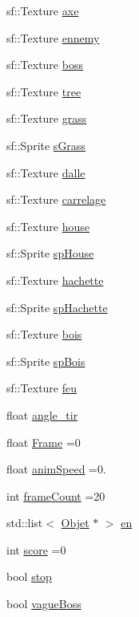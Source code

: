 \begin{DoxyCompactItemize}
\item 
sf\+::\+Texture \hyperlink{classsfml_jeu_a1110dee5dbd800eb85c6f8588c57f906}{axe}
\item 
sf\+::\+Texture \hyperlink{classsfml_jeu_a7bb478fb8a036dba31d51b0678f71930}{ennemy}
\item 
sf\+::\+Texture \hyperlink{classsfml_jeu_a38bffc74c712e3237ddd2e4361b0868c}{boss}
\item 
sf\+::\+Texture \hyperlink{classsfml_jeu_ac53f32205231b1555a312b5298ee024f}{tree}
\item 
sf\+::\+Texture \hyperlink{classsfml_jeu_aea5ada868bfe1291ee70b4827ec54240}{grass}
\item 
sf\+::\+Sprite \hyperlink{classsfml_jeu_a74a092fa8b6b1a34ca7858dce6b22f42}{s\+Grass}
\item 
sf\+::\+Texture \hyperlink{classsfml_jeu_a595b5cbf01e0dd2f30985df54ac9db1b}{dalle}
\item 
sf\+::\+Texture \hyperlink{classsfml_jeu_a0e6b0177e0dadf4351c7e432652d2fd6}{carrelage}
\item 
sf\+::\+Texture \hyperlink{classsfml_jeu_a802c6b71f6fc4338ed0c002c95d2f3cb}{house}
\item 
sf\+::\+Sprite \hyperlink{classsfml_jeu_ad4d63e936baa8c93f82296f3eac35c98}{sp\+House}
\item 
sf\+::\+Texture \hyperlink{classsfml_jeu_ab3fd5eb49efc3763c68019588eeba638}{hachette}
\item 
sf\+::\+Sprite \hyperlink{classsfml_jeu_a931aef757693c4633ab16eb1a4cbebf8}{sp\+Hachette}
\item 
sf\+::\+Texture \hyperlink{classsfml_jeu_aec313ef2ce46db16fd996024dcae9976}{bois}
\item 
sf\+::\+Sprite \hyperlink{classsfml_jeu_a9af83fa09c80255e70bd3a8a7ba10372}{sp\+Bois}
\item 
sf\+::\+Texture \hyperlink{classsfml_jeu_aedabf9043126c13b0273aeccfb5e2919}{feu}
\item 
float \hyperlink{classsfml_jeu_ab18424bf232e9f1b62e11f640949bea1}{angle\+\_\+tir}
\item 
float \hyperlink{classsfml_jeu_acdd19b14b14f6ac3a56ee38faf8d48a0}{Frame} =0
\item 
float \hyperlink{classsfml_jeu_a19267ed3eb166f9ec905ea91dd3e17ce}{anim\+Speed} =0.
\item 
int \hyperlink{classsfml_jeu_a633d930d55acd213f00d46925e844cf3}{frame\+Count} =20
\item 
std\+::list$<$ \hyperlink{class_objet}{Objet} $\ast$ $>$ \hyperlink{classsfml_jeu_a2c1d73b31fc57543c6cefc092eac46d6}{en}
\item 
int \hyperlink{classsfml_jeu_ad6c5ba152a0c7d689d46f80c375d5791}{score} =0
\item 
bool \hyperlink{classsfml_jeu_a5f9d5fd6b29588b94b20207f94ab7d56}{stop}
\item 
bool \hyperlink{classsfml_jeu_aecfcdbd46fd205fe344f4a1c41fbf175}{vague\+Boss}
\end{DoxyCompactItemize}


